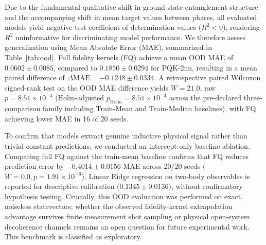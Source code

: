 \documentclass[conference]{IEEEtran}
\begin{document}
Due to the fundamental qualitative shift in ground-state entanglement structure and the accompanying shift in mean target values between phases, all evaluated models yield negative test coefficient of determination values ($R^2 < 0$), rendering $R^2$ uninformative for discriminating model performance. We therefore assess generalization using Mean Absolute Error (MAE), summarized in Table~\ref{tab:ood}. Full fidelity kernels (FQ) achieve a mean OOD MAE of $0.0602 \pm 0.0085$, compared to $0.1850 \pm 0.0294$ for PQK-2nn, resulting in a mean paired difference of $\Delta\mathrm{MAE} = -0.1248 \pm 0.0334$. A retrospective paired Wilcoxon signed-rank test on the OOD MAE difference yields $W=21.0$, raw $p=8.51\times 10^{-4}$ (Holm-adjusted $p_{\mathrm{Holm}}=8.51\times 10^{-4}$ across the pre-declared three-comparison family including Train-Mean and Train-Median baselines), with FQ achieving lower MAE in 16 of 20 seeds.

To confirm that models extract genuine inductive physical signal rather than trivial constant predictions, we conducted an intercept-only baseline ablation. Comparing full FQ against the train-mean baseline confirms that FQ reduces prediction error by $-0.4014 \pm 0.0156$ MAE across 20/20 seeds ($W=0.0, p=1.91\times 10^{-6}$). Linear Ridge regression on two-body observables is reported for descriptive calibration ($0.1345 \pm 0.0136$), without confirmatory hypothesis testing. Crucially, this OOD evaluation was performed on exact, noiseless statevectors; whether the observed fidelity-kernel extrapolation advantage survives finite measurement shot sampling or physical open-system decoherence channels remains an open question for future experimental work. This benchmark is classified as exploratory.


\end{document}
